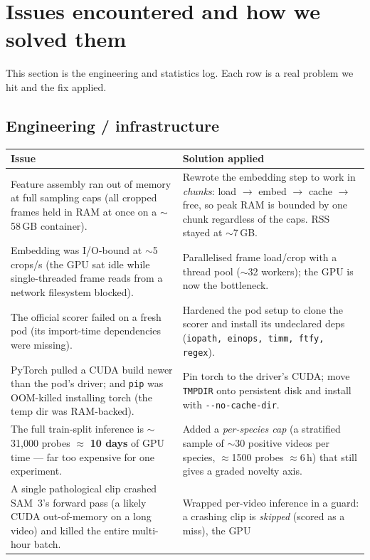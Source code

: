 \documentclass[11pt]{article}
\begin{document}
\section{Issues encountered and how we solved them}
This section is the engineering and statistics log. Each row is a real problem we hit and the fix applied.

\subsection{Engineering / infrastructure}
\begin{table}[h]
\centering
\small
\begin{tabularx}{\textwidth}{p{4.3cm}Y}
\toprule
Issue & Solution applied \\
\midrule
Feature assembly ran out of memory at full sampling caps (all cropped frames held in RAM at once on a
$\sim$58\,GB container). &
Rewrote the embedding step to work in \emph{chunks}: load $\to$ embed $\to$ cache $\to$ free, so peak RAM
is bounded by one chunk regardless of the caps. RSS stayed at $\sim$7\,GB. \\
\addlinespace
Embedding was I/O-bound at $\sim$5 crops/s (the GPU sat idle while single-threaded frame reads from a
network filesystem blocked). &
Parallelised frame load/crop with a thread pool ($\sim$32 workers); the GPU is now the bottleneck. \\
\addlinespace
The official scorer failed on a fresh pod (its import-time dependencies were missing). &
Hardened the pod setup to clone the scorer and install its undeclared deps
(\texttt{iopath, einops, timm, ftfy, regex}). \\
\addlinespace
PyTorch pulled a CUDA build newer than the pod's driver; and \texttt{pip} was OOM-killed installing torch
(the temp dir was RAM-backed). &
Pin torch to the driver's CUDA; move \texttt{TMPDIR} onto persistent disk and install with
\texttt{-{}-no-cache-dir}. \\
\addlinespace
The full train-split inference is $\sim$31{,}000 probes $\approx$ \textbf{10 days} of GPU time --- far too
expensive for one experiment. &
Added a \emph{per-species cap} (a stratified sample of $\sim$30 positive videos per species, $\approx$1500
probes $\approx$6\,h) that still gives a graded novelty axis. \\
\addlinespace
A single pathological clip crashed SAM~3's forward pass (a likely CUDA out-of-memory on a long video) and
killed the entire multi-hour batch. &
Wrapped per-video inference in a guard: a crashing clip is \emph{skipped} (scored as a miss), the GPU

\end{tabularx}
\end{table}
\end{document}
